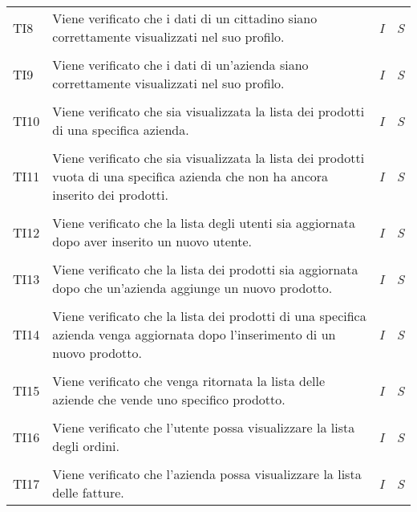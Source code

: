 \begin{longtable}{ >{\centering}p{} >{}p{}
				>{\centering}p{} >{\centering}p{}}
			\tabularnewline
			\hypertarget{TI8}{TI8} & Viene verificato che i dati di un cittadino siano 
			correttamente visualizzati nel suo profilo. & \textit{I} & \textit{S}\\
			
			\tabularnewline
			\hypertarget{TI9}{TI9} & Viene verificato che i dati di un'azienda siano 
			correttamente visualizzati nel suo profilo. & \textit{I} & \textit{S}\\
			
			\tabularnewline
			\hypertarget{TI10}{TI10} & Viene verificato che sia visualizzata la lista dei 
			prodotti di una specifica azienda. & \textit{I} & \textit{S}\\
			
			\tabularnewline
			\hypertarget{TI11}{TI11} & Viene verificato che sia visualizzata la lista dei 
			prodotti vuota di una specifica azienda che non ha ancora inserito dei prodotti. 
			& \textit{I} & \textit{S}\\
			
			\tabularnewline
			\hypertarget{TI12}{TI12} & Viene verificato che la lista degli utenti sia 
			aggiornata dopo aver inserito un nuovo utente. & \textit{I} & \textit{S}\\
			
			\tabularnewline
			\hypertarget{TI13}{TI13} & Viene verificato che la lista dei prodotti sia 
			aggiornata dopo che un'azienda aggiunge un nuovo prodotto. & \textit{I} & 
			\textit{S}\\
			
			\tabularnewline
			\hypertarget{TI14}{TI14} & Viene verificato che la lista dei prodotti di una 
			specifica azienda venga aggiornata dopo l'inserimento di un nuovo prodotto. & 
			\textit{I} & \textit{S}\\
			
			\tabularnewline
			\hypertarget{TI15}{TI15} & Viene verificato che venga ritornata la lista 
			delle aziende che vende uno specifico prodotto. & \textit{I} & \textit{S}\\
			
			\tabularnewline
			\hypertarget{TI16}{TI16} & Viene verificato che l'utente possa visualizzare 
			la lista degli ordini. & \textit{I} & \textit{S}\\
			
			\tabularnewline
			\hypertarget{TI17}{TI17} & Viene verificato che l'azienda possa visualizzare 
			la lista delle fatture. & \textit{I} & \textit{S}\\
			

\end{longtable}
